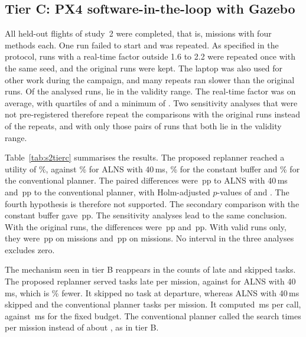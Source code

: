 \subsection{Tier C: PX4 software-in-the-loop with Gazebo}\label{sec:Ss2-tierc}
All  held-out flights of study~2 were completed, that is,  missions with four methods each. One run
failed to start and was repeated. As specified in the protocol,  runs with a real-time factor outside
1.6 to 2.2 were repeated once with the same seed, and the original runs were kept. The laptop was also used for other
work during the campaign, and many repeats ran slower than the original runs. Of the  analysed runs,
 lie in the validity range. The real-time factor was  on average, with quartiles of
 and a minimum of . Two sensitivity analyses that were not pre-registered therefore repeat the
comparisons with the original runs instead of the repeats, and with only those pairs of runs that both lie in the
validity range.

Table~\ref{tab:s2tierc} summarises the results. The proposed replanner reached a utility of \%, against
\% for ALNS with 40\,ms, \% for the constant buffer and \% for the conventional
planner. The paired differences were \,pp to ALNS with 40\,ms and \,pp to the conventional
planner, with Holm-adjusted $p$-values of  and . The fourth hypothesis is therefore not
supported. The secondary comparison with the constant buffer gave \,pp. The sensitivity analyses lead to
the same conclusion. With the original runs, the differences were \,pp and \,pp.
With valid runs only, they were \,pp on  missions and \,pp on
 missions. No interval in the three analyses excludes zero.


The mechanism seen in tier B reappears in the counts of late and skipped tasks. The proposed replanner served
 tasks late per mission, against  for ALNS with 40\,ms, which is \%
fewer. It skipped no task at departure, whereas ALNS with 40\,ms skipped  and the conventional planner
 tasks per mission. It computed \,ms per call, against \,ms for the fixed
budget. The conventional planner called the search  times per mission instead of about
, as in tier B.


